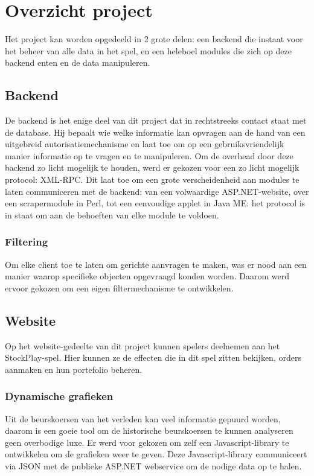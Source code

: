 \chapter{Overzicht project}
Het project kan worden opgedeeld in 2 grote delen: een backend die instaat voor het beheer van alle data in het spel, en een heleboel modules die zich op deze backend enten en de data manipuleren.

\section{Backend}
De backend is het enige deel van dit project dat in rechtstreeks contact staat met de database. Hij bepaalt wie welke informatie kan opvragen aan de hand van een uitgebreid autorisatiemechanisme en laat toe om op een gebruiksvriendelijk manier informatie op te vragen en te manipuleren.
Om de overhead door deze backend zo licht mogelijk te houden, werd er gekozen voor een zo licht mogelijk protocol: XML-RPC. Dit laat toe om een grote verscheidenheid aan modules te laten communiceren met de backend: van een volwaardige ASP.NET-website, over een scrapermodule in Perl, tot een eenvoudige applet in Java ME: het protocol is in staat om aan de behoeften van elke module te voldoen.
\subsection{Filtering}
Om elke client toe te laten om gerichte aanvragen te maken, was er nood aan een manier waarop specifieke objecten opgevraagd konden worden. Daarom werd ervoor gekozen om een eigen filtermechanisme te ontwikkelen.

\section{Website}
Op het website-gedeelte van dit project kunnen spelers deelnemen aan het StockPlay-spel. Hier kunnen ze de effecten die in dit spel zitten bekijken, orders aanmaken en hun portefolio beheren.

\subsection{Dynamische grafieken}
Uit de beurskoersen van het verleden kan veel informatie gepuurd worden, daarom is een goeie tool om de historische beurskoersen te kunnen analyseren geen overbodige luxe. Er werd voor gekozen om zelf een Javascript-library te ontwikkelen om de grafieken weer te geven. Deze Javascript-library communiceert via JSON met de publieke ASP.NET webservice om de nodige data op te halen.

